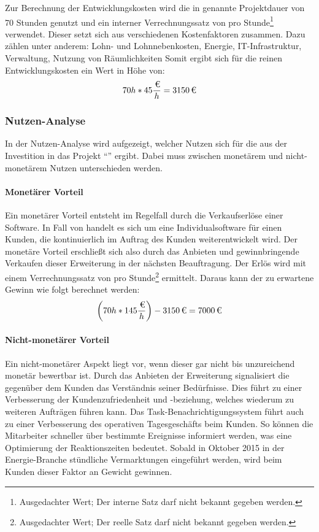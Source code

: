 Zur Berechnung der Entwicklungskosten wird die in  genannte Projektdauer von 70
Stunden genutzt und ein interner Verrechnungssatz von  pro Stunde\footnote{Ausgedachter Wert; Der interne Satz darf nicht
bekannt gegeben werden.} verwendet.
Dieser setzt sich aus verschiedenen Kostenfaktoren zusammen. Dazu zählen unter anderem: Lohn- und Lohnnebenkosten, Energie,
IT-Infrastruktur, Verwaltung, Nutzung von Räumlichkeiten \etc Somit ergibt sich für die reinen Entwicklungskosten ein Wert in Höhe
von:
\[ 70h * 45{\frac{\eur{}}{h}} = \eur{3150} \]

\subsubsection{Nutzen-Analyse} 
\label{subsub:Nutzen-Analyse}
In der Nutzen-Analyse wird aufgezeigt, welcher Nutzen sich für die  aus der Investition in das Projekt "`\titel"'
 ergibt. Dabei muss zwischen monetärem und nicht-monetärem Nutzen unterschieden werden.

\paragraph{Monetärer Vorteil}
Ein monetärer Vorteil entsteht im Regelfall durch die Verkaufserlöse einer Software. In Fall von  handelt es sich
um eine Individualsoftware für einen Kunden, die kontinuierlich im Auftrag des Kunden weiterentwickelt wird. Der monetäre Vorteil
erschließt sich also durch das Anbieten und gewinnbringende Verkaufen dieser Erweiterung in der nächsten Beauftragung. Der Erlös
wird mit einem Verrechnungssatz von  pro Stunde\footnote{Ausgedachter Wert; Der reelle Satz darf nicht
bekannt gegeben werden.} ermittelt. Daraus kann der zu erwartene Gewinn wie folgt berechnet werden:
\[ \bigg(70h * 145{\frac{\eur{}}{h}}\bigg) - \eur{3150} = \eur{7000} \]
	
\paragraph{Nicht-monetärer Vorteil}
Ein nicht-monetärer Aspekt liegt vor, wenn dieser gar nicht bis unzureichend monetär bewertbar ist. Durch das Anbieten der
Erweiterung signalisiert die  gegenüber dem Kunden das Verständnis seiner Bedürfnisse. Dies führt zu einer
Verbesserung der Kundenzufriedenheit und -beziehung, welches wiederum zu weiteren Aufträgen führen kann. Das
Task-Benachrichtigungssystem führt auch zu einer Verbesserung des operativen Tagesgeschäfts beim Kunden. So können die Mitarbeiter
schneller über bestimmte Ereignisse informiert werden, was eine Optimierung der Reaktionszeiten bedeutet. Sobald in Oktober 2015
in der Energie-Branche stündliche Vermarktungen eingeführt werden, wird beim Kunden dieser Faktor an Gewicht gewinnen.

